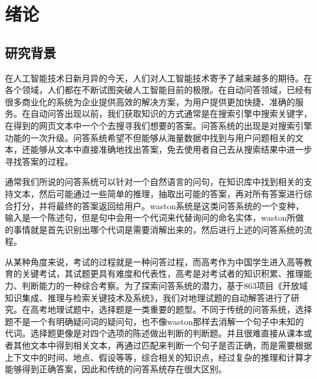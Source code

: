 \documentclass[master, winfont]{njuthesis}
\begin{document}
\tableofcontents

\listoffigures

\listoftables

\mainmatter

\chapter{绪论}\label{chapter_introduction}
\section{研究背景}
在人工智能技术日新月异的今天，人们对人工智能技术寄予了越来越多的期待。在各个领域，人们都在不断试图突破人工智能目前的极限。在自动问答领域，已经有很多商业化的系统为企业提供高效的解决方案，为用户提供更加快捷、准确的服务。在自动问答出现以前，我们获取知识的方式通常是在搜索引擎中搜索关键字，在得到的网页文本中一个个去搜寻我们想要的答案。问答系统的出现是对搜索引擎功能的一次升级。问答系统希望不但能够从海量数据中找到与用户问题相关的文本，还能够从文本中直接准确地找出答案，免去使用者自己去从搜索结果中进一步寻找答案的过程。

通常我们所说的问答系统可以针对一个自然语言的问句，在知识库中找到相关的支持文本，然后可能通过一些简单的推理，抽取出可能的答案，再对所有答案进行综合打分，并将最终的答案返回给用户。waston系统是这类问答系统的一个变种，输入是一个陈述句，但是句中会用一个代词来代替询问的命名实体，waston所做的事情就是首先识别出哪个代词是需要消解出来的，然后进行上述的问答系统的流程\cite{Ferrucci2010}。

从某种角度来说，考试的过程就是一种问答过程，而高考作为中国学生进入高等教育的关键考试，其试题更具有难度和代表性，高考是对考试者的知识积累、推理能力、判断能力的一种综合考察。为了探索问答系统的潜力，基于863项目《开放域知识集成、推理与检索关键技术及系统》，我们对地理试题的自动解答进行了研究。在高考地理试题中，选择题是一类重要的题型。不同于传统的问答系统，选择题不是一个有明确疑问词的疑问句，也不像waston那样去消解一个句子中未知的代词。选择题更像是对四个选项的陈述做出判断的判断题。并且很难直接从课本或者其他文本中得到相关文本，再通过匹配来判断一个句子是否正确，而是需要根据上下文中的时间、地点、假设等等，综合相关的知识点，经过复杂的推理和计算才能够得到正确答案，因此和传统的问答系统存在很大区别。
\end{document}
